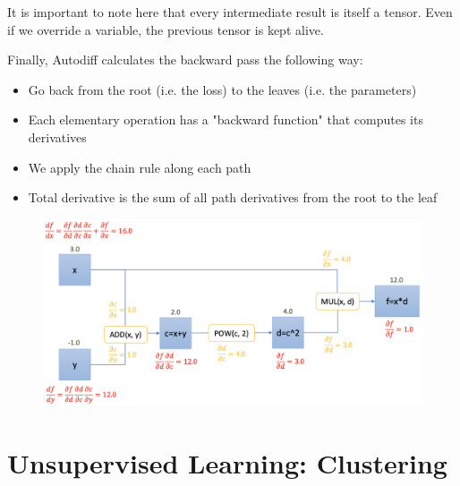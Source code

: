 \documentclass[a4paper]{extarticle}
\begin{document}
It is important to note here that every intermediate result is itself a tensor. Even if we override a variable, the previous tensor is kept alive.

Finally, Autodiff calculates the backward pass the following way:
\begin{itemize}
    \item Go back from the root (i.e. the loss) to the leaves (i.e. the parameters)
    \item Each elementary operation has a "backward function" that computes its derivatives
    \item We apply the chain rule along each path
    \item Total derivative is the sum of all path derivatives from the root to the leaf
\end{itemize}

\begin{figure}[H]
    \includegraphics[width=15cm]{../images/IntroML_Fig8-3}
    \centering
\end{figure}

\section{Unsupervised Learning: Clustering}
\end{document}
